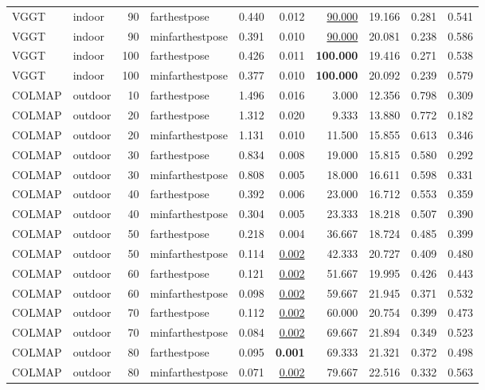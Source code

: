 \begin{table}[H]
\begin{tabular}{llrlrrrrrr}
VGGT & indoor & 90 & farthestpose & 0.440 & 0.012 & \underline{90.000} & 19.166 & 0.281 & 0.541 \\
VGGT & indoor & 90 & minfarthestpose & 0.391 & 0.010 & \underline{90.000} & 20.081 & 0.238 & 0.586 \\
VGGT & indoor & 100 & farthestpose & 0.426 & 0.011 & \textbf{100.000} & 19.416 & 0.271 & 0.538 \\
VGGT & indoor & 100 & minfarthestpose & 0.377 & 0.010 & \textbf{100.000} & 20.092 & 0.239 & 0.579 \\
\midrule
COLMAP & outdoor & 10 & farthestpose & 1.496 & 0.016 & 3.000 & 12.356 & 0.798 & 0.309 \\
COLMAP & outdoor & 20 & farthestpose & 1.312 & 0.020 & 9.333 & 13.880 & 0.772 & 0.182 \\
COLMAP & outdoor & 20 & minfarthestpose & 1.131 & 0.010 & 11.500 & 15.855 & 0.613 & 0.346 \\
COLMAP & outdoor & 30 & farthestpose & 0.834 & 0.008 & 19.000 & 15.815 & 0.580 & 0.292 \\
COLMAP & outdoor & 30 & minfarthestpose & 0.808 & 0.005 & 18.000 & 16.611 & 0.598 & 0.331 \\
COLMAP & outdoor & 40 & farthestpose & 0.392 & 0.006 & 23.000 & 16.712 & 0.553 & 0.359 \\
COLMAP & outdoor & 40 & minfarthestpose & 0.304 & 0.005 & 23.333 & 18.218 & 0.507 & 0.390 \\
COLMAP & outdoor & 50 & farthestpose & 0.218 & 0.004 & 36.667 & 18.724 & 0.485 & 0.399 \\
COLMAP & outdoor & 50 & minfarthestpose & 0.114 & \underline{0.002} & 42.333 & 20.727 & 0.409 & 0.480 \\
COLMAP & outdoor & 60 & farthestpose & 0.121 & \underline{0.002} & 51.667 & 19.995 & 0.426 & 0.443 \\
COLMAP & outdoor & 60 & minfarthestpose & 0.098 & \underline{0.002} & 59.667 & 21.945 & 0.371 & 0.532 \\
COLMAP & outdoor & 70 & farthestpose & 0.112 & \underline{0.002} & 60.000 & 20.754 & 0.399 & 0.473 \\
COLMAP & outdoor & 70 & minfarthestpose & 0.084 & \underline{0.002} & 69.667 & 21.894 & 0.349 & 0.523 \\
COLMAP & outdoor & 80 & farthestpose & 0.095 & \textbf{0.001} & 69.333 & 21.321 & 0.372 & 0.498 \\
COLMAP & outdoor & 80 & minfarthestpose & 0.071 & \underline{0.002} & 79.667 & 22.516 & 0.332 & 0.563 \\

\end{tabular}
\end{table}
